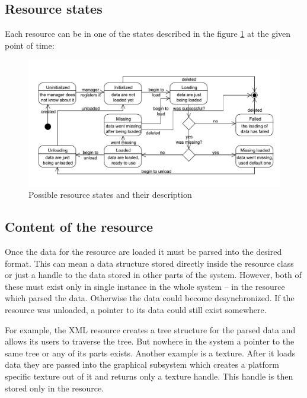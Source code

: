 \documentclass[a4paper, 12pt]{report}
\begin{document}
\subsection{Resource states}

Each resource can be in one of the states described in the figure \ref{fig:resource-states} at the given point of time:

\begin{figure}[htbp]
	\centering
		\includegraphics[width=1\textwidth]{ResourceStates.pdf}
	\caption[Possible resource states]{Possible resource states and their description}
	\label{fig:resource-states}
\end{figure}

\subsection{Content of the resource}

Once the data for the resource are loaded it must be parsed into the desired format. This can mean a data structure stored directly inside the resource class or just a handle to the data stored in other parts of the system. However, both of these must exist only in single instance in the whole system -- in the resource which parsed the data. Otherwise the data could become desynchronized. If the resource was unloaded, a pointer to its data could still exist somewhere. 

For example, the XML resource creates a tree structure for the parsed data and allows its users to traverse the tree. But nowhere in the system a pointer to the same tree or any of its parts exists. Another example is a texture. After it loads data they are passed into the graphical subsystem which creates a platform specific texture out of it and returns only a texture handle. This handle is then stored only in the resource.
\end{document}
